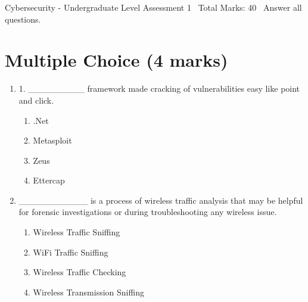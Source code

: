 \documentclass[12pt]{article}
\begin{document}
\begin{center}
Cybersecurity - Undergraduate Level Assessment 1 \
Total Marks: 40 \
Answer all questions.
\end{center}

\section*{Multiple Choice (4 marks)}
\begin{enumerate}[label=\arabic*.]
\item 1. \_\_\_\_\_\_\_\_\_ framework made cracking of vulnerabilities easy like point and click.
\begin{enumerate}[label=(\alph*)]
    \item .Net
    \item Metasploit
    \item Zeus
    \item Ettercap
\end{enumerate}
\item \_\_\_\_\_\_\_\_\_\_\_ is a process of wireless traffic analysis that may be helpful for forensic investigations or during troubleshooting any wireless issue.
\begin{enumerate}[label=(\alph*)]
    \item Wireless Traffic Sniffing
    \item WiFi Traffic Sniffing
    \item Wireless Traffic Checking
    \item Wireless Transmission Sniffing
\end{enumerate}
\end{enumerate}
\end{document}
